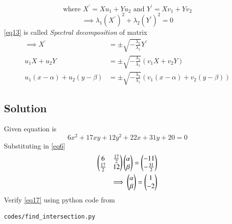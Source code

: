 \documentclass[journal,12pt,twocolumn]{IEEEtran}
\begin{document}
\begin{equation}\label{eq12}
	\text{where } X^\prime = Xu_1 + Yu_2 \text{ and } Y^\prime = Xv_1 + Yv_2
\end{equation}
\begin{equation}\label{eq13}
	\implies \lambda_1 (X^\prime)^2 + \lambda_2 (Y^\prime)^2 = 0
\end{equation}
\eqref{eq13} is called \textit{Spectral decomposition} of matrix
\begin{align}
	\implies X^\prime &= \pm \sqrt{-\frac{\lambda_2}{\lambda_1}}Y^\prime\\	
	u_1X + u_2Y &= \pm \sqrt{-\frac{\lambda_2}{\lambda_1}}(v_1X + v_2Y)\\
	\label{eq14}u_1(x-\alpha) + u_2(y-\beta) &= \pm \sqrt{-\frac{\lambda_2}{\lambda_1}}(v_1(x-\alpha) + v_2(y-\beta))
\end{align}
\subsection{Solution}
Given equation is
\begin{equation}\label{eq15}
	6x^2 + 17xy + 12y^2 + 22x + 31y + 20 = 0
\end{equation}
Substituting in \eqref{eq6}
\begin{align}
	\label{eq16}\begin{pmatrix} 6 & \frac{17}{2}\\\frac{17}{2} & 12\end{pmatrix}\begin{pmatrix}\alpha \\ \beta\end{pmatrix} = \begin{pmatrix}-11 \\ -\frac{31}{2}\end{pmatrix} \\
	\label{eq17}\implies \begin{pmatrix}\alpha \\ \beta\end{pmatrix} = \begin{pmatrix}1 \\ -2\end{pmatrix}
\end{align}
Verify  \eqref{eq17} using python code from
\begin{lstlisting}
codes/find_intersection.py
\end{lstlisting}
\end{document}
